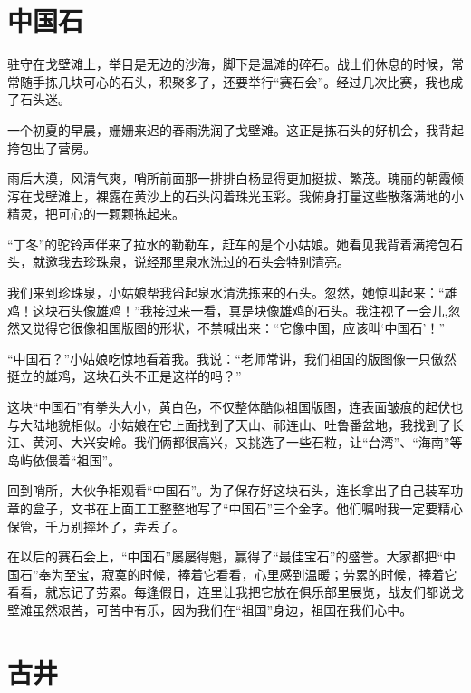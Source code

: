 \documentclass[12pt,UTF-8,openany]{ctexbook}
\begin{document}
\chapter{中国石}

\begin{large}
    
    驻守在戈壁滩上，举目是无边的沙海，脚下是温滩的碎石。战士们休息的时候，常常随手拣几块可心的石头，积聚多了，还要举行“赛石会”。经过几次比赛，我也成了石头迷。
    
    一个初夏的早晨，姗姗来迟的春雨洗润了戈壁滩。这正是拣石头的好机会，我背起挎包出了营房。
    
    雨后大漠，风清气爽，哨所前面那一排排白杨显得更加挺拔、繁茂。瑰丽的朝霞倾泻在戈壁滩上，裸露在黄沙上的石头闪着珠光玉彩。我俯身打量这些散落满地的小精灵，把可心的一颗颗拣起来。
    
    “丁冬”的驼铃声伴来了拉水的勒勒车，赶车的是个小姑娘。她看见我背着满挎包石头，就邀我去珍珠泉，说经那里泉水洗过的石头会特别清亮。
    
    我们来到珍珠泉，小姑娘帮我舀起泉水清洗拣来的石头。忽然，她惊叫起来：“雄鸡！这块石头像雄鸡！”我接过来一看，真是块像雄鸡的石头。我注视了一会儿,忽然又觉得它很像祖国版图的形状，不禁喊出来：“它像中国，应该叫‘中国石’！”
    
    “中国石？”小姑娘吃惊地看着我。我说：“老师常讲，我们祖国的版图像一只傲然挺立的雄鸡，这块石头不正是这样的吗？”
    
    这块“中国石”有拳头大小，黄白色，不仅整体酷似祖国版图，连表面皱痕的起伏也与大陆地貌相似。小姑娘在它上面找到了天山、祁连山、吐鲁番盆地，我找到了长江、黄河、大兴安岭。我们俩都很高兴，又挑选了一些石粒，让“台湾”、“海南”等岛屿依偎着“祖国”。
    
    回到哨所，大伙争相观看“中国石”。为了保存好这块石头，连长拿出了自己装军功章的盒子，文书在上面工工整整地写了“中国石”三个金字。他们嘱咐我一定要精心保管，千万别摔坏了，弄丢了。
    
    在以后的赛石会上，“中国石”屡屡得魁，赢得了“最佳宝石”的盛誉。大家都把“中国石”奉为至宝，寂寞的时候，捧着它看看，心里感到温暖；劳累的时候，捧着它看看，就忘记了劳累。每逢假日，连里让我把它放在俱乐部里展览，战友们都说戈壁滩虽然艰苦，可苦中有乐，因为我们在“祖国”身边，祖国在我们心中。
    
\end{large}



\chapter{古井}
\end{document}
